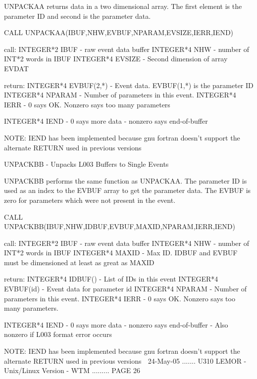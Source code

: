    UNPACKAA returns data in a two dimensional array.  The first element is the
   parameter ID and second is the parameter data.
 
        CALL UNPACKAA(IBUF,NHW,EVBUF,NPARAM,EVSIZE,IERR,IEND)
 
   call:   INTEGER*2  IBUF       - raw event data buffer
           INTEGER*4  NHW        - number of INT*2 words in IBUF
           INTEGER*4  EVSIZE     - Second dimension of array EVDAT
 
   return: INTEGER*4  EVBUF(2,*) - Event data. EVBUF(1,*) is the parameter ID
           INTEGER*4  NPARAM     - Number of parameters in this event.
           INTEGER*4  IERR       - 0 says OK. Nonzero says too many parameters
 
           INTEGER*4  IEND       - 0 says more data - nonzero says end-of-buffer
 
   NOTE: IEND has been implemented because gnu fortran doesn't support the
   alternate RETURN used in previous versions
 
 
 
   UNPACKBB - Unpacks L003 Buffers to Single Events
 
   UNPACKBB performs the same function as UNPACKAA.  The parameter ID  is used
   as  an  index  to  the EVBUF array to get the parameter data.  The EVBUF is
   zero for parameters which were not present in the event.
 
        CALL UNPACKBB(IBUF,NHW,IDBUF,EVBUF,MAXID,NPARAM,IERR,IEND)
 
   call:   INTEGER*2  IBUF      - raw event data buffer
           INTEGER*4  NHW       - number of INT*2 words in IBUF
           INTEGER*4  MAXID     - Max ID. IDBUF and EVBUF must be dimensioned
                                  at least as great as MAXID
 
   return: INTEGER*4  IDBUF()   - List of IDs in this event
           INTEGER*4  EVBUF(id) - Event data for parameter id
           INTEGER*4  NPARAM    - Number of parameters in this event.
           INTEGER*4  IERR      - 0 says OK. Nonzero says too many parameters.
 
           INTEGER*4  IEND       - 0 says more data - nonzero says end-of-buffer
                                 - Also nonzero if L003 format error occurs
 
   NOTE: IEND has been implemented because gnu fortran doesn't support the
   alternate RETURN used in previous versions
    
   24-May-05 ....... U310  LEMOR - Unix/Linux Version - WTM ......... PAGE  26
 
